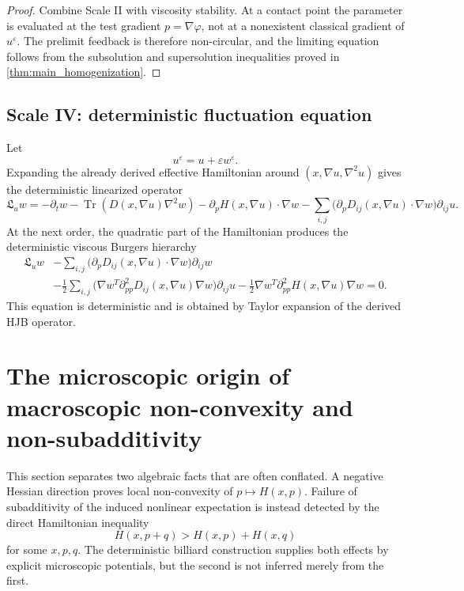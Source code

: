 \documentclass[12pt, letterpaper]{amsart}
\providecommand{\Tr}{\operatorname{Tr}}
\theoremstyle{plain}
\theoremstyle{definition}
\theoremstyle{remark}
\begin{document}
\begin{proof}
Combine Scale II with viscosity stability.  At a contact point the parameter is evaluated at the test gradient $p=\nabla\varphi$, not at a nonexistent classical gradient of $u^\varepsilon$.  The prelimit feedback is therefore non-circular, and the limiting equation follows from the subsolution and supersolution inequalities proved in \cref{thm:main_homogenization}.
\end{proof}

\subsection{Scale IV: deterministic fluctuation equation}

Let
\begin{equation}
    u^\varepsilon=u+\varepsilon w^\varepsilon.
\end{equation}
Expanding the already derived effective Hamiltonian around $(x,\nabla u,\nabla^2u)$ gives the deterministic linearized operator
\begin{equation}
    \mathfrak L_u w
    =-\partial_t w
     -\Tr(D(x,\nabla u)\nabla^2w)
     -\partial_pH(x,\nabla u)\cdot\nabla w
     -\sum_{i,j}\bigl(\partial_pD_{ij}(x,\nabla u)\cdot\nabla w\bigr)\partial_{ij}u .
\end{equation}
At the next order, the quadratic part of the Hamiltonian produces the deterministic viscous Burgers hierarchy
\begin{align}
\label{eq:pde_scale_IV_burgers_hierarchy}
    \mathfrak L_u w
    &-\sum_{i,j}\bigl(\partial_pD_{ij}(x,\nabla u)\cdot\nabla w\bigr)\partial_{ij}w \\
    &-\frac12\sum_{i,j}\bigl(\nabla w^T\partial_{pp}^2D_{ij}(x,\nabla u)\nabla w\bigr)\partial_{ij}u
    -\frac12\nabla w^T\partial_{pp}^2H(x,\nabla u)\nabla w=0 .
\end{align}
This equation is deterministic and is obtained by Taylor expansion of the derived HJB operator.


\section{The microscopic origin of macroscopic non-convexity and non-subadditivity}
\label{sec:nonconvexity}

This section separates two algebraic facts that are often conflated.  A negative Hessian direction proves local non-convexity of $p\mapsto H(x,p)$.  Failure of subadditivity of the induced nonlinear expectation is instead detected by the direct Hamiltonian inequality
\begin{equation}
\label{eq:hamiltonian_superadditive_defect}
    H(x,p+q)>H(x,p)+H(x,q)
\end{equation}
for some $x,p,q$.  The deterministic billiard construction supplies both effects by explicit microscopic potentials, but the second is not inferred merely from the first.
\end{document}
